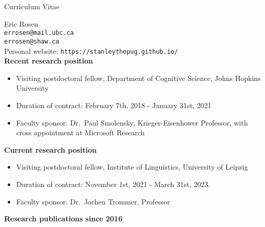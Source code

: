 \documentclass[11pt]{article}
\newcommand{\bo}[1]{\textbf{#1}}
\newcommand{\bi}{\begin{itemize}}
\newcommand{\ii}{\item}
\newcommand{\ei}{\end{itemize}}
\begin{document}
\begin{center}
\LARGE
Curriculum Vitae
\normalsize
\end{center}
\medskip

\noindent Eric Rosen \\
\verb+errosen@mail.ubc.ca+ \\
\verb+errosen@shaw.ca+ \\
Personal website: \verb+https://stanleythepug.github.io/+\\

\noindent \textbf{Recent research position}
\bi
\ii[] Visiting postdoctoral fellow, Department of Cognitive Science, Johns Hopkins University
\ii[] Duration of contract: February 7th, 2018 - January 31st, 2021
\ii[] Faculty sponsor: Dr.\ Paul Smolensky, Krieger-Eisenhower Professor, with cross appointment at Microsoft Research
\ei

\noindent \textbf{Current research position}
\bi
\ii[] Visiting postdoctoral fellow, Institute of Linguistics, University of Leipzig
\ii[] Duration of contract: November 1st, 2021 - March 31st, 2023.
\ii[] Faculty sponsor: Dr.\ Jochen Trommer, Professor
\ei

\noindent \bo{Research publications since 2016}
\end{document}
